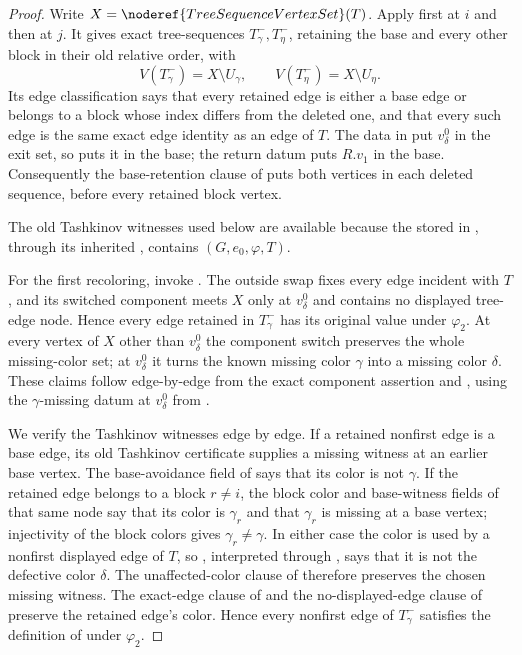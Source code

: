 \begin{proof}
Write $X=\noderef{TreeSequenceVertexSet}(T)$.  Apply
 first at $i$ and then at $j$.
It gives exact tree-sequences $T^-_\gamma,T^-_\eta$, retaining the base
and every other block in their old relative order, with
\[
 V(T^-_\gamma)=X\setminus U_\gamma,\qquad
 V(T^-_\eta)=X\setminus U_\eta.
 \tag{1}
\]
Its edge classification says that every retained edge is either a base
edge or belongs to a block whose index differs from the deleted one, and
that every such edge is the same exact edge identity as an edge of $T$.
The data in  put $v^0_\delta$ in the exit
set, so
 puts it in the base; the return
datum  puts $R.v_1$ in the base.
Consequently the base-retention clause of
 puts both vertices in each
deleted sequence, before every retained block vertex.

The old Tashkinov witnesses used below are available because the
 stored in
, through its inherited
, contains
$(G,e_0,\varphi,T)$.

For the first recoloring, invoke
.  The outside swap fixes
every edge incident with $T$, and its switched component meets $X$ only
at $v^0_\delta$ and contains no displayed tree-edge node.  Hence every
edge retained in $T^-_\gamma$ has its original value under
$\varphi_2$.  At every vertex of $X$ other than $v^0_\delta$ the
component switch preserves the whole missing-color set; at
$v^0_\delta$ it turns the known missing color $\gamma$ into a missing
color $\delta$.  These claims follow edge-by-edge from the exact
component assertion and
, using the
$\gamma$-missing datum at $v^0_\delta$ from
.

We verify the Tashkinov witnesses edge by edge.  If a retained nonfirst
edge is a base edge, its old Tashkinov certificate supplies a missing
witness at an earlier base vertex.  The base-avoidance field of
 says that its color is not
$\gamma$.  If the retained edge belongs to a block $r\ne i$, the block
color and base-witness fields of that same node say that its color is
$\gamma_r$ and that $\gamma_r$ is missing at a base vertex; injectivity
of the block colors gives $\gamma_r\ne\gamma$.  In either case the color
is used by a nonfirst displayed edge of $T$, so
, interpreted through
, says that it is not the defective color
$\delta$.  The unaffected-color clause of
 therefore preserves the
chosen missing witness.  The exact-edge clause of
 and the no-displayed-edge clause
of  preserve the retained
edge's color.  Hence every nonfirst edge of $T^-_\gamma$ satisfies the
definition of  under $\varphi_2$.


\end{proof}
